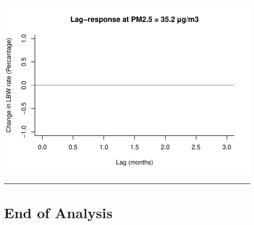\documentclass[
]{article}
\begin{document}
\includegraphics{v_1_files/figure-latex/unnamed-chunk-5-1.pdf}

\begin{center}\rule{0.5\linewidth}{0.5pt}\end{center}

\section{End of Analysis}\label{end-of-analysis}
\end{document}
